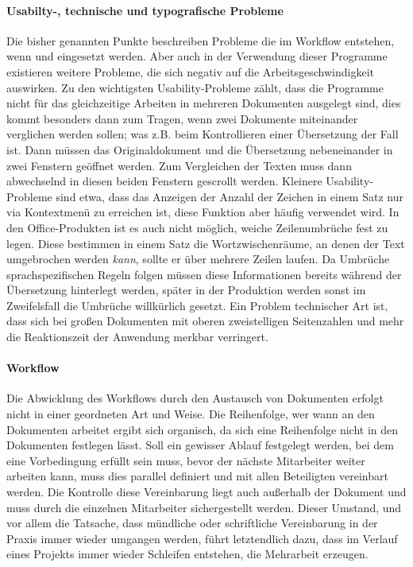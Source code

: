 \paragraph{Usabilty-, technische und typografische Probleme} Die bisher genannten Punkte beschreiben Probleme die im Workflow entstehen, wenn  und  eingesetzt werden. Aber auch in der Verwendung dieser Programme existieren weitere Probleme, die sich negativ auf die Arbeitsgeschwindigkeit auswirken. Zu den wichtigsten Usability-Probleme zählt, dass die Programme nicht für das gleichzeitige Arbeiten in mehreren Dokumenten ausgelegt sind, dies kommt besonders dann zum Tragen, wenn zwei Dokumente miteinander verglichen werden sollen; was z.B. beim Kontrollieren einer Übersetzung der Fall ist. Dann müssen das Originaldokument und die Übersetzung nebeneinander in zwei Fenstern geöffnet werden. Zum Vergleichen der Texten muss dann abwechselnd in diesen beiden Fenstern gescrollt werden. Kleinere Usability-Probleme sind etwa, dass das Anzeigen der Anzahl der Zeichen in einem Satz nur via Kontextmenü zu erreichen ist, diese Funktion aber häufig verwendet wird. In den Office-Produkten ist es auch nicht möglich, weiche Zeilenumbrüche fest zu legen. Diese bestimmen in einem Satz die Wortzwischenräume, an denen der Text umgebrochen werden \emph{kann}, sollte er über mehrere Zeilen laufen. Da Umbrüche sprachspezifischen Regeln folgen müssen diese Informationen bereits während der Übersetzung hinterlegt werden, später in der Produktion werden sonst im Zweifelsfall die Umbrüche willkürlich gesetzt. Ein Problem technischer Art ist, dass sich bei großen Dokumenten mit oberen zweistelligen Seitenzahlen und mehr die Reaktionszeit der Anwendung merkbar verringert.

\paragraph{Workflow} Die Abwicklung des Workflows durch den Austausch von Dokumenten erfolgt nicht in einer geordneten Art und Weise. Die Reihenfolge, wer wann an den Dokumenten arbeitet ergibt sich organisch, da sich eine Reihenfolge nicht in den Dokumenten festlegen lässt. Soll ein gewisser Ablauf festgelegt werden, bei dem eine Vorbedingung erfüllt sein muss, bevor der nächste Mitarbeiter weiter arbeiten kann, muss dies parallel definiert und mit allen Beteiligten vereinbart werden. Die Kontrolle diese Vereinbarung liegt auch außerhalb der Dokument und muss durch die einzelnen Mitarbeiter sichergestellt werden. Dieser Umstand, und vor allem die Tatsache, dass mündliche oder schriftliche Vereinbarung in der Praxis immer wieder umgangen werden, führt letztendlich dazu, dass im Verlauf eines Projekts immer wieder Schleifen entstehen, die Mehrarbeit erzeugen.

